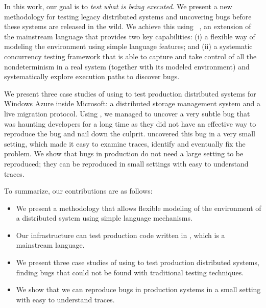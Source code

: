 In this work, our goal is to \emph{test what is being executed}. We present a new methodology for testing legacy distributed systems and uncovering bugs before these systems are released in the wild. We achieve this using \psharp~\cite{deligiannis2015psharp}, an extension of the mainstream language \csharp that provides two key capabilities: (i) a flexible way of modeling the environment using simple language features; and (ii) a systematic concurrency testing framework that is able to capture and take control of all the nondeterminism in a real system (together with its modeled environment) and systematically explore execution paths to discover bugs. 

We present three case studies of using \psharp to test production distributed systems for Windows Azure inside Microsoft: a distributed storage management system and a live migration protocol. Using \psharp, we managed to uncover a very subtle bug that was haunting developers for a long time as they did not have an effective way to reproduce the bug and nail down the culprit. \psharp uncovered this bug in a very small setting, which made it easy to examine traces, identify and eventually fix the problem. We show that bugs in production do not need a large setting to be reproduced; they can be reproduced in small settings with easy to understand traces.

To summarize, our contributions are as follows:

\begin{itemize}
\item We present a methodology that allows flexible modeling of the environment of a distributed system using simple language mechanisms.
\item Our infrastructure can test production code written in \csharp, which is a mainstream language.
\item We present three case studies of using \psharp to test production distributed systems, finding bugs that could not be found with traditional testing techniques.
\item We show that we can reproduce bugs in production systems in a small setting with easy to understand traces.
\end{itemize}


